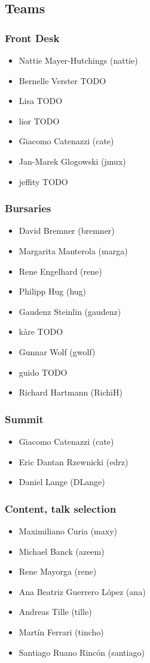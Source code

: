 \documentclass[t]{beamer}
\begin{document}
\subsection{Teams}

\begin{frame}
	\frametitle{Front Desk}
	\begin{itemize}
		\item Nattie Mayer-Hutchings (nattie)
		\item Bernelle Verster TODO
		\item Lisa TODO
		\item lior TODO
		\item Giacomo Catenazzi (cate)
		\item Jan-Marek Glogowski (jmux)
		\item jeffity TODO
	\end{itemize}
\end{frame}

\begin{frame}
	\frametitle{Bursaries}
	\begin{itemize}
		\item David Bremner (bremner)
		\item Margarita Manterola (marga)
		\item Rene Engelhard (rene)
		\item Philipp Hug (hug)
		\item Gaudenz Steinlin (gaudenz)
		\item kåre TODO
		\item Gunnar Wolf (gwolf)
		\item guido TODO
		\item Richard Hartmann (RichiH)
	\end{itemize}
\end{frame}

\begin{frame}
	\frametitle{Summit}
	\begin{itemize}
		\item Giacomo Catenazzi (cate)
		\item Eric Dantan Rzewnicki (edrz)
		\item Daniel Lange (DLange)
	\end{itemize}
\end{frame}

\begin{frame}
	\frametitle{Content, talk selection}
	\begin{itemize}
		\item Maximiliano Curia (maxy)
		\item Michael Banck (azeem)
		\item Rene Mayorga (rene)
		\item Ana Beatriz Guerrero López (ana)
		\item Andreas Tille (tille)
		\item Martín Ferrari (tincho)
		\item Santiago Ruano Rincón (santiago)
	\end{itemize}
\end{frame}
\end{document}

